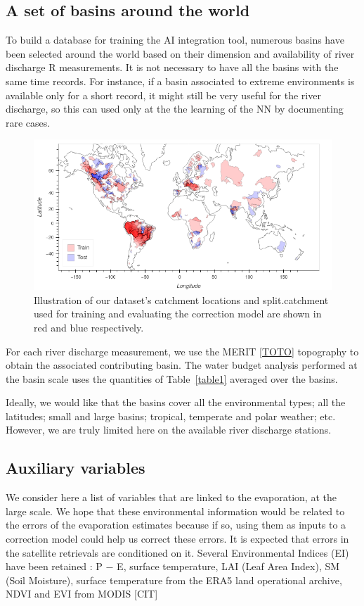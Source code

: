 \documentclass[draft]{agujournal2019}
\begin{document}
\subsection{A set of basins around the world}
\label{def_basins}
To build a database for training the AI integration tool, numerous basins have been selected around the world based on their dimension and availability of river discharge R measurements. 
It is not necessary to have all the basins with the same time records. 
For instance, if a basin associated to extreme environments is available only for a short record, it might still be very useful for the river discharge, so this can used only at the the learning of the NN by documenting rare cases. 


\begin{figure}[h]
\centering
\includegraphics[width=\textwidth]{figure1}
\caption{Illustration of our dataset's catchment locations and split.catchment used for training and evaluating the correction model are shown in red and blue respectively.}
\end{figure}





For each river discharge measurement, we use the MERIT \ref{TOTO} topography to obtain the associated contributing basin. The water budget analysis performed at the basin scale uses the quantities of Table~\ref{table1} averaged over the basins.

Ideally, we would like that the basins cover all the environmental types; all the latitudes; small and large basins; tropical, temperate and polar weather; etc. However, we are truly limited here on the available river discharge stations. 

\subsection{Auxiliary variables}
\label{auxiliary_info}
We consider here a list of variables that are linked to the evaporation, at the large scale. 
We hope that these environmental information would be related to the errors of the evaporation estimates because if so, using them as inputs to a correction model could help us correct these errors. 
It is expected that errors in the satellite retrievals are conditioned on it.  
Several Environmental Indices (EI) have been retained : P − E, surface temperature, LAI (Leaf Area Index), SM (Soil Moisture), 
surface temperature from the ERA5 land operational archive, NDVI and EVI from MODIS [CIT]
\end{document}
